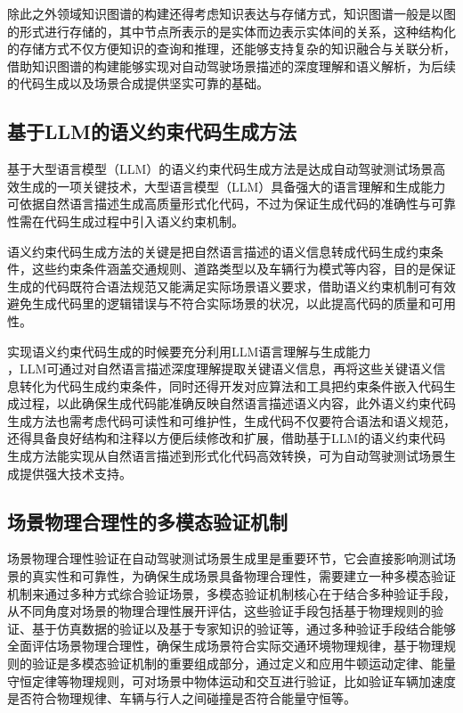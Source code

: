 除此之外领域知识图谱的构建还得考虑知识表达与存储方式，知识图谱一般是以图的形式进行存储的\cite{Yao2022React}，其中节点所表示的是实体而边表示实体间的关系，这种结构化的存储方式不仅方便知识的查询和推理，还能够支持复杂的知识融合与关联分析，借助知识图谱的构建能够实现对自动驾驶场景描述的深度理解和语义解析，为后续的代码生成以及场景合成提供坚实可靠的基础。
	
	\subsection{基于LLM的语义约束代码生成方法}
基于大型语言模型（LLM）的语义约束代码生成方法是达成自动驾驶测试场景高效生成的一项关键技术，大型语言模型（LLM）具备强大的语言理解和生成能力可依据自然语言描述生成高质量形式化代码，不过为保证生成代码的准确性与可靠性需在代码生成过程中引入语义约束机制\cite{Zhang2023CAT}。
	
语义约束代码生成方法的关键是把自然语言描述的语义信息转成代码生成约束条件，这些约束条件涵盖交通规则、道路类型以及车辆行为模式等内容，目的是保证生成的代码既符合语法规范又能满足实际场景语义要求\cite{Zhang2022AdversarialRobustness}，借助语义约束机制可有效避免生成代码里的逻辑错误与不符合实际场景的状况，以此提高代码的质量和可用性。
	
实现语义约束代码生成的时候要充分利用LLM语言理解与生成能力\\ \cite{Zheng2023JudgingLLM}，LLM可通过对自然语言描述深度理解提取关键语义信息，再将这些关键语义信息转化为代码生成约束条件，同时还得开发对应算法和工具把约束条件嵌入代码生成过程，以此确保生成代码能准确反映自然语言描述语义内容，此外语义约束代码生成方法也需考虑代码可读性和可维护性，生成代码不仅要符合语法和语义规范，还得具备良好结构和注释以方便后续修改和扩展，借助基于LLM的语义约束代码生成方法能实现从自然语言描述到形式化代码高效转换\cite{zhong2023language}，可为自动驾驶测试场景生成提供强大技术支持。
	
	\subsection{场景物理合理性的多模态验证机制}
	场景物理合理性验证在自动驾驶测试场景生成里是重要环节\cite{zhao2025key}，它会直接影响测试场景的真实性和可靠性，为确保生成场景具备物理合理性，需要建立一种多模态验证机制来通过多种方式综合验证场景，多模态验证机制核心在于结合多种验证手段，从不同角度对场景的物理合理性展开评估，这些验证手段包括基于物理规则的验证、基于仿真数据的验证以及基于专家知识的验证等，通过多种验证手段结合能够全面评估场景物理合理性，确保生成场景符合实际交通环境物理规律\cite{Yao2022React}，基于物理规则的验证是多模态验证机制的重要组成部分，通过定义和应用牛顿运动定律、能量守恒定律等物理规则，可对场景中物体运动和交互进行验证，比如验证车辆加速度是否符合物理规律、车辆与行人之间碰撞是否符合能量守恒等。

